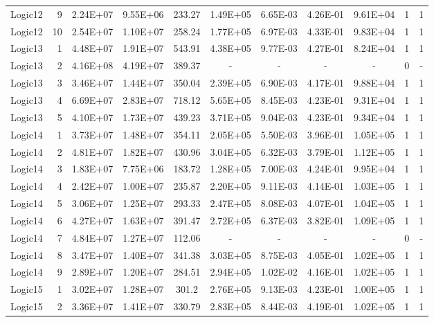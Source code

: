 \begin{longtable}{@{}l!{\vrule}r!{\vrule}c!{\vrule}c!{\vrule}c!{\vrule}c!{\vrule}c!{\vrule}c!{\vrule}c!{\vrule}c!{\vrule}c@{}}
Logic12 & 9 & 2.24E+07 & 9.55E+06 & 233.27 & 1.49E+05 & 6.65E-03 & 4.26E-01 & 9.61E+04 & 1 & 1 \\
Logic12 & 10 & 2.54E+07 & 1.10E+07 & 258.24 & 1.77E+05 & 6.97E-03 & 4.33E-01 & 9.83E+04 & 1 & 1 \\
\hline
{}
Logic13 & 1 & 4.48E+07 & 1.91E+07 & 543.91 & 4.38E+05 & 9.77E-03 & 4.27E-01 & 8.24E+04 & 1 & 1 \\
Logic13 & 2 & 4.16E+08 & 4.19E+07 & 389.37 & - & - & - & - & 0 & - \\
Logic13 & 3 & 3.46E+07 & 1.44E+07 & 350.04 & 2.39E+05 & 6.90E-03 & 4.17E-01 & 9.88E+04 & 1 & 1 \\
Logic13 & 4 & 6.69E+07 & 2.83E+07 & 718.12 & 5.65E+05 & 8.45E-03 & 4.23E-01 & 9.31E+04 & 1 & 1 \\
Logic13 & 5 & 4.10E+07 & 1.73E+07 & 439.23 & 3.71E+05 & 9.04E-03 & 4.23E-01 & 9.34E+04 & 1 & 1 \\
\hline
Logic14 & 1 & 3.73E+07 & 1.48E+07 & 354.11 & 2.05E+05 & 5.50E-03 & 3.96E-01 & 1.05E+05 & 1 & 1 \\
Logic14 & 2 & 4.81E+07 & 1.82E+07 & 430.96 & 3.04E+05 & 6.32E-03 & 3.79E-01 & 1.12E+05 & 1 & 1 \\
Logic14 & 3 & 1.83E+07 & 7.75E+06 & 183.72 & 1.28E+05 & 7.00E-03 & 4.24E-01 & 9.95E+04 & 1 & 1 \\
Logic14 & 4 & 2.42E+07 & 1.00E+07 & 235.87 & 2.20E+05 & 9.11E-03 & 4.14E-01 & 1.03E+05 & 1 & 1 \\
Logic14 & 5 & 3.06E+07 & 1.25E+07 & 293.33 & 2.47E+05 & 8.08E-03 & 4.07E-01 & 1.04E+05 & 1 & 1 \\
Logic14 & 6 & 4.27E+07 & 1.63E+07 & 391.47 & 2.72E+05 & 6.37E-03 & 3.82E-01 & 1.09E+05 & 1 & 1 \\
Logic14 & 7 & 4.84E+07 & 1.27E+07 & 112.06 & - & - & - & - & 0 & - \\
Logic14 & 8 & 3.47E+07 & 1.40E+07 & 341.38 & 3.03E+05 & 8.75E-03 & 4.05E-01 & 1.02E+05 & 1 & 1 \\
Logic14 & 9 & 2.89E+07 & 1.20E+07 & 284.51 & 2.94E+05 & 1.02E-02 & 4.16E-01 & 1.02E+05 & 1 & 1 \\
\hline
{}
Logic15 & 1 & 3.02E+07 & 1.28E+07 & 301.2 & 2.76E+05 & 9.13E-03 & 4.23E-01 & 1.00E+05 & 1 & 1 \\
Logic15 & 2 & 3.36E+07 & 1.41E+07 & 330.79 & 2.83E+05 & 8.44E-03 & 4.19E-01 & 1.02E+05 & 1 & 1 \\

\end{longtable}
